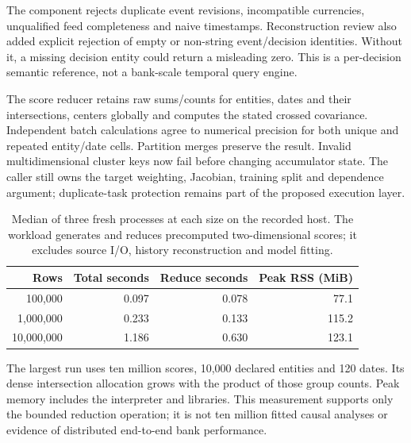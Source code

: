 The component rejects duplicate event revisions, incompatible currencies,
unqualified feed completeness and naive timestamps. Reconstruction review
also added explicit rejection of empty or non-string event/decision
identities. Without it, a missing decision entity could return a
misleading zero. This is a per-decision semantic reference, not a
bank-scale temporal query engine.

The score reducer retains raw sums/counts for entities, dates and their
intersections, centers globally and computes the stated crossed
covariance. Independent batch calculations agree to numerical precision
for both unique and repeated entity/date cells. Partition merges preserve
the result. Invalid multidimensional cluster keys now fail before
changing accumulator state. The caller still owns the target weighting,
Jacobian, training split and dependence argument; duplicate-task
protection remains part of the proposed execution layer.

\begin{table}[htbp]\centering\small


\begin{tabular}{@{}rrrr@{}}
\toprule Rows & Total seconds & Reduce seconds & Peak RSS (MiB)\\\midrule
100,000 & 0.097 & 0.078 & 77.1\\
1,000,000 & 0.233 & 0.133 & 115.2\\
10,000,000 & 1.186 & 0.630 & 123.1\\
\bottomrule\end{tabular}



\caption{Median of three fresh processes at each size on the recorded host.
The workload generates and reduces precomputed two-dimensional scores;
it excludes source I/O, history reconstruction and model fitting.}
\label{r3:scale-measurement}
\end{table}

The largest run uses ten million scores, 10,000 declared entities and
120 dates. Its dense intersection allocation grows with the product
of those group counts. Peak memory includes the interpreter and
libraries. This measurement supports only the bounded reduction
operation; it is not ten million fitted causal analyses or evidence
of distributed end-to-end bank performance.

